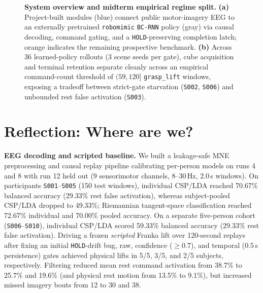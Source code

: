 \documentclass{article}
\begin{document}
\begin{figure}[t]
{\begin{tikzpicture}[>=Latex, font=\scriptsize]
\end{tikzpicture}%
}
\caption{\textbf{System overview and midterm empirical regime split.} \textbf{(a)} Project-built modules (blue) connect public motor-imagery EEG to an externally pretrained \texttt{robomimic} \texttt{BC-RNN} policy (gray) via causal decoding, command gating, and a \texttt{HOLD}-preserving completion latch; orange indicates the remaining prospective benchmark. \textbf{(b)} Across 36 learned-policy rollouts (3 scene seeds per gate), cube acquisition and terminal retention separate cleanly across an empirical command-count threshold of $(59, 120]$ \texttt{grasp\_lift} windows, exposing a tradeoff between strict-gate starvation (\texttt{S002}, \texttt{S006}) and unbounded rest false activation (\texttt{S003}).}
\label{fig:pipeline}
\end{figure}

\section{Reflection: Where are we?}

\textbf{EEG decoding and scripted baseline.} We built a leakage-safe MNE preprocessing and causal replay pipeline calibrating per-person models on runs 4 and 8 with run 12 held out (9 sensorimotor channels, 8--30\,Hz, 2.0\,s windows). On participants \texttt{S001}--\texttt{S005} (150 test windows), individual CSP/LDA reached 70.67\% balanced accuracy (29.33\% rest false activation), whereas subject-pooled CSP/LDA dropped to 49.33\%; Riemannian tangent-space classification reached 72.67\% individual and 70.00\% pooled accuracy. On a separate five-person cohort (\texttt{S006}--\texttt{S010}), individual CSP/LDA scored 59.33\% balanced accuracy (29.33\% rest false activation). Driving a frozen \emph{scripted} Franka lift over 120-second replays after fixing an initial \texttt{HOLD}-drift bug, raw, confidence ($\ge\!0.7$), and temporal ($0.5$\,s persistence) gates achieved physical lifts in 5/5, 3/5, and 2/5 subjects, respectively. Filtering reduced mean rest command activation from 38.7\% to 25.7\% and 19.6\% (and physical rest motion from 13.5\% to 9.1\%), but increased missed imagery bouts from 12 to 30 and 38.
\end{document}
